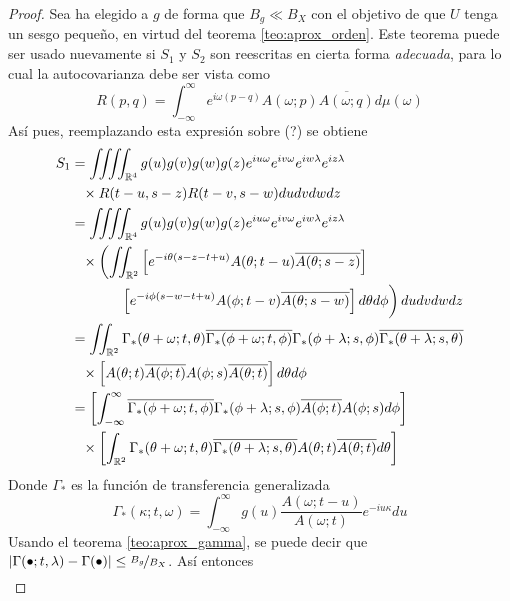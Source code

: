 \documentclass[12pt,letterpaper]{book}
\newcommand{\R}{\mathbb{R}}
\newcommand{\intR}{\int_{-\infty}^{\infty}}
\newcommand{\abso}[1]{\left| #1 \right|}
\newcommand{\pheq}{\phantom{=}}
\begin{document}
\begin{proof}
Sea ha elegido a $g$ de forma que $B_g \ll B_X$ con el objetivo de que $U$ tenga un sesgo pequeño, en virtud del teorema \ref{teo:aprox_orden}. Este teorema puede ser usado nuevamente si $S_1$ y $S_2$ son reescritas en cierta forma \textit{adecuada}, para lo cual la autocovarianza debe ser vista como
\begin{equation}
R(p,q) = \intR e^{i \omega (p-q)} A(\omega; p)\overline{A(\omega; q)} d\mu(\omega) 
\end{equation}
Así pues, reemplazando esta expresión sobre (?) se obtiene
\begin{align*}
S_1 &=
\iiiint_{\R^{4}} g(u) g(v) g(w) g(z) e^{i u \omega} e^{i v \omega} e^{i w \lambda} e^{i z \lambda} \\
&\pheq \times R(t-u,s-z)R(t-v,s-w) du dv dw dz \\
&= 
\iiiint_{\R^{4}} g(u) g(v) g(w) g(z) e^{i u \omega} e^{i v \omega} e^{i w \lambda} e^{i z \lambda} \\
&\pheq \times \left( 
\iint_{\R^{2}} 
\left[ 
e^{-i \theta (s-z-t+u)} A(\theta; t-u) \overline{A(\theta; s-z)} 
\right] 
\right. \\
&\pheq 
\left. \vphantom{\int} \phantom{times}
\left[ e^{-i \phi (s-w-t+u)} A(\phi; t-v) \overline{A(\theta; s-w)} \right] d\theta d\phi
\right) du dv dw dz
\\
 &= \iint_{\R^{2}} \Gamma_*(\theta+ \omega; t, \theta) \overline{\Gamma_*(\phi + \omega; t, \phi)}
 \Gamma_*(\phi+ \lambda; s, \phi) \overline{\Gamma_*(\theta + \lambda; s, \theta)} \\
 &\pheq \times
 \left[
 A(\theta; t) \overline{A(\phi; t)} A(\phi; s) \overline{A(\theta; t)}
 \right] d\theta d\phi
\\
 &= \left[ \intR \overline{\Gamma_*(\phi + \omega; t, \phi)} \Gamma_*(\phi+ \lambda; s, \phi)
 \overline{A(\phi; t)} A(\phi; s) d\phi \right] \\
 &\pheq \times \left[ \int_{\R^{2}} \Gamma_*(\theta+ \omega; t, \theta) 
  \overline{\Gamma_*(\theta + \lambda; s, \theta)}  
 A(\theta; t)   \overline{A(\theta; t)} d\theta \right] 
\end{align*}
Donde $\Gamma_*$ es la función de transferencia generalizada
\begin{equation}
\Gamma_*(\kappa; t, \omega) = \intR g(u) \frac{A(\omega; t-u)}{A(\omega; t)} e^{-i u \kappa} du
\end{equation}
Usando el teorema \ref{teo:aprox_gamma}, se puede decir que $\abso{\Gamma(\bullet; t, \lambda) - \Gamma(\bullet)} \leq \nicefrac{B_g}{B_X}$. Así entonces
\begin{align*}

\end{align*}
\end{proof}
\end{document}
